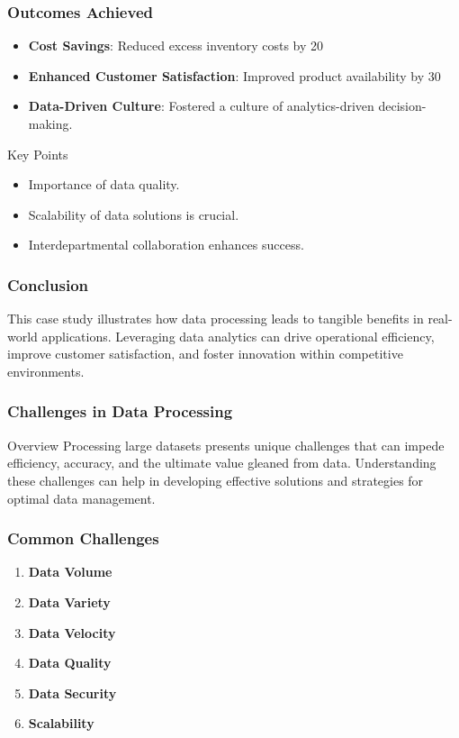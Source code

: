 \documentclass[aspectratio=169]{beamer}
\begin{document}
\begin{frame}[fragile]
    \frametitle{Outcomes Achieved}
    
    \begin{itemize}
        \item \textbf{Cost Savings}: Reduced excess inventory costs by 20%
        \item \textbf{Enhanced Customer Satisfaction}: Improved product availability by 30%
        \item \textbf{Data-Driven Culture}: Fostered a culture of analytics-driven decision-making.
    \end{itemize}
    
    \begin{block}{Key Points}
        \begin{itemize}
            \item Importance of data quality.
            \item Scalability of data solutions is crucial.
            \item Interdepartmental collaboration enhances success.
        \end{itemize}
    \end{block}
\end{frame}

\begin{frame}[fragile]
    \frametitle{Conclusion}
    This case study illustrates how data processing leads to tangible benefits in real-world applications. Leveraging data analytics can drive operational efficiency, improve customer satisfaction, and foster innovation within competitive environments.
\end{frame}

\begin{frame}[fragile]
    \frametitle{Challenges in Data Processing}
    \begin{block}{Overview}
        Processing large datasets presents unique challenges that can impede efficiency, accuracy, and the ultimate value gleaned from data. Understanding these challenges can help in developing effective solutions and strategies for optimal data management.
    \end{block}
\end{frame}

\begin{frame}[fragile]
    \frametitle{Common Challenges}
    \begin{enumerate}
        \item \textbf{Data Volume}
        \item \textbf{Data Variety}
        \item \textbf{Data Velocity}
        \item \textbf{Data Quality}
        \item \textbf{Data Security}
        \item \textbf{Scalability}
    \end{enumerate}
\end{frame}
\end{document}
